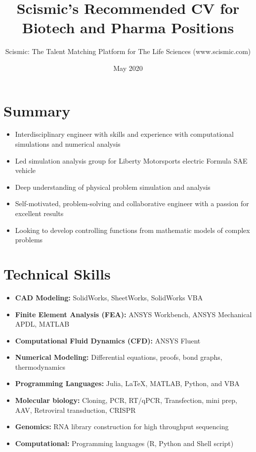 \documentclass{article}
\title{Scismic's Recommended CV for Biotech and Pharma Positions}
\author{Scismic: The Talent Matching Platform for The Life Sciences (www.scismic.com)}
\date{May 2020}
\begin{document}

\makecvtitle %

\section{Summary}

	\begin{itemize}
		\item Interdisciplinary engineer with skills and experience with computational simulations and numerical analysis
		\item Led simulation analysis group for Liberty Motorsports electric Formula SAE vehicle
		\item Deep understanding of physical problem simulation and analysis 
		\item Self-motivated, problem-solving and collaborative engineer with a passion for excellent results
		\item Looking to develop controlling functions from mathematic models of complex problems
	\end{itemize}


\section{Technical Skills}
	
	\begin{itemize}
		\item \textbf{CAD Modeling:} SolidWorks, SheetWorks, SolidWorks VBA
		\item \textbf{Finite Element Analysis (FEA):} ANSYS Workbench, ANSYS Mechanical APDL, MATLAB
		\item \textbf{Computational Fluid Dynamics (CFD):} ANSYS Fluent 
		\item \textbf{Numerical Modeling:} Differential equations, proofs, bond graphs, thermodynamics 
		\item \textbf{Programming Languages:} Julia, \LaTeX, MATLAB, Python, and VBA
		\item \textbf{Molecular biology:} Cloning, PCR, RT/qPCR, Transfection, mini prep, AAV, Retroviral transduction, CRISPR 
		\item \textbf{Genomics:} RNA library construction for high throughput sequencing 
		\item \textbf{Computational:} Programming languages (R, Python and Shell script)
	\end{itemize}
 
\end{document}
